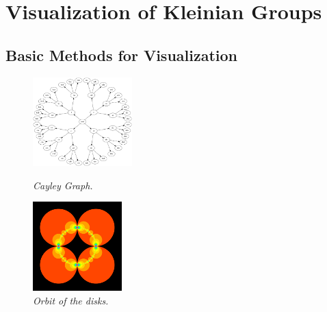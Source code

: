 
\section{Visualization of Kleinian Groups}

\subsection{Basic Methods for Visualization}

\begin{figure}[htbp]
 \begin{minipage}[t]{0.5\hsize}
  \center
  \includegraphics[height=1.35in, keepaspectratio]{img/cayleyGraphabcd.png}
  \caption{\textit{Cayley Graph.}}
  \label{fig:cayleyGraph}
  \hspace*{\fill}
 \end{minipage}
 \begin{minipage}[t]{0.5\hsize}
  \center
  \includegraphics[height=1.35in, keepaspectratio]{img/preparation/basic/circleOrbit.png}
  \caption{\textit{Orbit of the disks.}}
  \label{fig:circOrbit}
  \hspace*{\fill}
 \end{minipage}
\end{figure}

